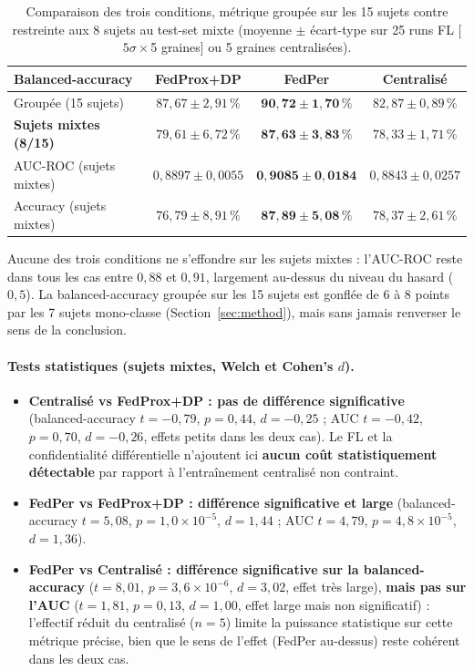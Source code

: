 \documentclass{acmart}
\begin{document}
\begin{table}[h!]
  \centering
  \small
  \caption{Comparaison des trois conditions, métrique groupée sur les 15
  sujets contre restreinte aux 8 sujets au test-set mixte (moyenne $\pm$
  écart-type sur 25 runs FL [$5\sigma\times$5 graines] ou 5 graines
  centralisées).}
  \label{tab:main_wesad}
  \begin{tabular}{lccc}
    \toprule
    Balanced-accuracy & FedProx+DP & FedPer & Centralisé \\
    \midrule
    Groupée (15 sujets)    & $87{,}67 \pm 2{,}91\,\%$ & $\mathbf{90{,}72 \pm 1{,}70\,\%}$ & $82{,}87 \pm 0{,}89\,\%$ \\
    \textbf{Sujets mixtes (8/15)} & $79{,}61 \pm 6{,}72\,\%$ & $\mathbf{87{,}63 \pm 3{,}83\,\%}$ & $78{,}33 \pm 1{,}71\,\%$ \\
    \midrule
    AUC-ROC (sujets mixtes) & $0{,}8897 \pm 0{,}0055$ & $\mathbf{0{,}9085 \pm 0{,}0184}$ & $0{,}8843 \pm 0{,}0257$ \\
    Accuracy (sujets mixtes) & $76{,}79 \pm 8{,}91\,\%$ & $\mathbf{87{,}89 \pm 5{,}08\,\%}$ & $78{,}37 \pm 2{,}61\,\%$ \\
    \bottomrule
  \end{tabular}
\end{table}

Aucune des trois conditions ne s'effondre sur les sujets mixtes : l'AUC-ROC
reste dans tous les cas entre $0{,}88$ et $0{,}91$, largement au-dessus du
niveau du hasard ($0{,}5$). La balanced-accuracy groupée sur les 15 sujets est
gonflée de 6 à 8 points par les 7 sujets mono-classe (Section~\ref{sec:method}),
mais sans jamais renverser le sens de la conclusion.

\paragraph{Tests statistiques (sujets mixtes, Welch et Cohen's $d$).}
\begin{itemize}
  \item \textbf{Centralisé vs FedProx+DP : pas de différence significative}
  (balanced-accuracy $t=-0{,}79$, $p=0{,}44$, $d=-0{,}25$ ; AUC $t=-0{,}42$,
  $p=0{,}70$, $d=-0{,}26$, effets petits dans les deux cas). Le FL et la
  confidentialité différentielle n'ajoutent ici \textbf{aucun coût
  statistiquement détectable} par rapport à l'entraînement centralisé non
  contraint.
  \item \textbf{FedPer vs FedProx+DP : différence significative et large}
  (balanced-accuracy $t=5{,}08$, $p=1{,}0\times10^{-5}$, $d=1{,}44$ ; AUC
  $t=4{,}79$, $p=4{,}8\times10^{-5}$, $d=1{,}36$).
  \item \textbf{FedPer vs Centralisé : différence significative sur la
  balanced-accuracy} ($t=8{,}01$, $p=3{,}6\times10^{-6}$, $d=3{,}02$, effet
  très large), \textbf{mais pas sur l'AUC} ($t=1{,}81$, $p=0{,}13$,
  $d=1{,}00$, effet large mais non significatif) : l'effectif réduit du
  centralisé ($n=5$) limite la puissance statistique sur cette métrique
  précise, bien que le sens de l'effet (FedPer au-dessus) reste cohérent
  dans les deux cas.
\end{itemize}
\end{document}
